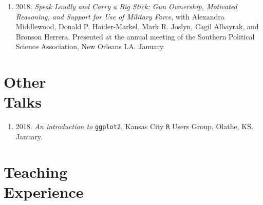 \documentclass[margin,line,pifont,palatino,courier]{res}
\begin{document}
\begin{resume}
\begin{enumerate}
\item 2018. \emph{Speak Loudly and Carry a Big Stick: Gun Ownership, Motivated
  Reasoning, and Support for Use of Military Force}, with Alexandra
Middlewood, Donald P. Haider-Markel, Mark R. Joslyn, Cagil Albayrak,
and Bronson Herrera. Presented at the annual meeting of the Southern
Political Science Association, New Orleans LA. January.
\end{enumerate}

\section{\sc Other\\ Talks}

\begin{enumerate}
\item 2018. \emph{An introduction to} \verb+ggplot2+, Kansas City \verb+R+ Users Group,
Olathe, KS. January.
\end{enumerate}

\section{\sc Teaching\\ Experience}


\end{resume}
\end{document}
